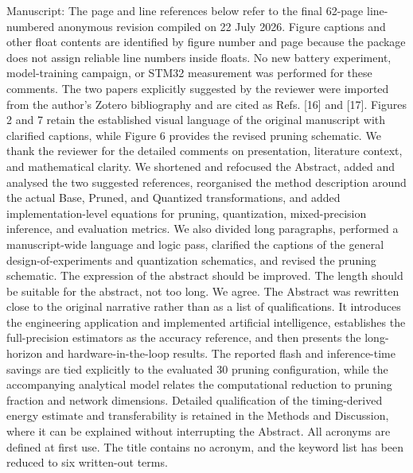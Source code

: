\markdownRendererDocumentBegin
\markdownRendererSectionBegin
{}\markdownRendererInterblockSeparator
{}Manuscript: \markdownRendererParagraphSeparator
{}The page and line references below refer to the final 62-page line-numbered anonymous revision compiled on 22 July 2026. Figure captions and other float contents are identified by figure number and page because the  package does not assign reliable line numbers inside floats. No new battery experiment, model-training campaign, or STM32 measurement was performed for these comments. The two papers explicitly suggested by the reviewer were imported from the author's Zotero bibliography and are cited as Refs. [16] and [17]. Figures 2 and 7 retain the established visual language of the original manuscript with clarified captions, while Figure 6 provides the revised pruning schematic.\markdownRendererInterblockSeparator
{}\markdownRendererSectionBegin
{}\markdownRendererInterblockSeparator
{}We thank the reviewer for the detailed comments on presentation, literature context, and mathematical clarity. We shortened and refocused the Abstract, added and analysed the two suggested references, reorganised the method description around the actual Base, Pruned, and Quantized transformations, and added implementation-level equations for pruning, quantization, mixed-precision inference, and evaluation metrics. We also divided long paragraphs, performed a manuscript-wide language and logic pass, clarified the captions of the general design-of-experiments and quantization schematics, and revised the pruning schematic.\markdownRendererInterblockSeparator
{}
\markdownRendererSectionEnd \markdownRendererSectionBegin
{}\markdownRendererInterblockSeparator
{}\markdownRendererBlockQuoteBegin
The expression of the abstract should be improved. The length should be suitable for the abstract, not too long.\markdownRendererBlockQuoteEnd \markdownRendererInterblockSeparator
{} We agree. The Abstract was rewritten close to the original narrative rather than as a list of qualifications. It introduces the engineering application and implemented artificial intelligence, establishes the full-precision estimators as the accuracy reference, and then presents the long-horizon and hardware-in-the-loop results. The reported flash and inference-time savings are tied explicitly to the evaluated 30\markdownRendererPercentSign{} pruning configuration, while the accompanying analytical model relates the computational reduction to pruning fraction and network dimensions. Detailed qualification of the timing-derived energy estimate and transferability is retained in the Methods and Discussion, where it can be explained without interrupting the Abstract. All acronyms are defined at first use. The title contains no acronym, and the keyword list has been reduced to six written-out terms.\markdownRendererParagraphSeparator
